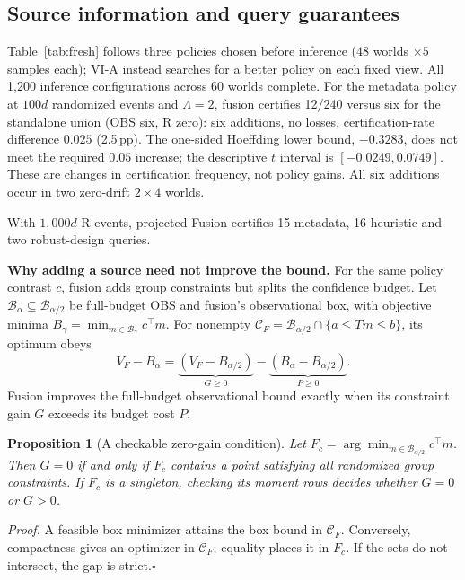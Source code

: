 \documentclass[conference]{IEEEtran}
\newtheorem{proposition}{Proposition}
\newcommand{\C}{\mathcal{C}}
\begin{document}



\subsection{Source information and query guarantees}\label{sec:information-results}
\begin{table}[t]
\centering
\caption{Projected Fusion: each row partitions 240 queries.}
\label{tab:fresh}
\end{table}

Table~\ref{tab:fresh} follows three policies chosen before inference ($48$ worlds $\times5$ samples each); VI-A instead searches for a better policy on each fixed view. All 1,200 inference configurations across 60 worlds complete. For the metadata policy at $100d$ randomized events and $\Lambda=2$, fusion certifies 12/240 versus six for the standalone union (OBS six, R zero): six additions, no losses, certification-rate difference $0.025$ (2.5\,pp). The one-sided Hoeffding lower bound, $-0.3283$, does not meet the required $0.05$ increase; the descriptive $t$ interval is $[-0.0249,0.0749]$. These are changes in certification frequency, not policy gains. All six additions occur in two zero-drift $2\times4$ worlds.

With $1{,}000d$ R events, projected Fusion certifies 15 metadata, 16 heuristic and two robust-design queries.


\textbf{Why adding a source need not improve the bound.}\label{sec:budget-geometry}
For the same policy contrast $c$, fusion adds group constraints but splits the confidence budget. Let $\mathcal B_\alpha\subseteq\mathcal B_{\alpha/2}$ be full-budget OBS and fusion's observational box, with objective minima $B_\gamma=\min_{m\in\mathcal B_\gamma}c^\top m$. For nonempty $\C_F=\mathcal B_{\alpha/2}\cap\{a\le Tm\le b\}$, its optimum obeys
\begin{equation}
 V_F-B_{\alpha}=\underbrace{(V_F-B_{\alpha/2})}_{G\ge0}
                  -\underbrace{(B_{\alpha}-B_{\alpha/2})}_{P\ge0}.\label{eq:gain-cost}
\end{equation}
Fusion improves the full-budget observational bound exactly when its constraint gain $G$ exceeds its budget cost $P$.

\begin{proposition}[A checkable zero-gain condition]\label{prop:box-face}
Let $F_c=\arg\min_{m\in\mathcal B_{\alpha/2}}c^\top m$. Then $G=0$ if and only if $F_c$ contains a point satisfying all randomized group constraints. If $F_c$ is a singleton, checking its moment rows decides whether $G=0$ or $G>0$.
\end{proposition}
\noindent\textit{Proof.} A feasible box minimizer attains the box bound in $\C_F$. Conversely, compactness gives an optimizer in $\C_F$; equality places it in $F_c$. If the sets do not intersect, the gap is strict.\hfill$\square$
\end{document}
